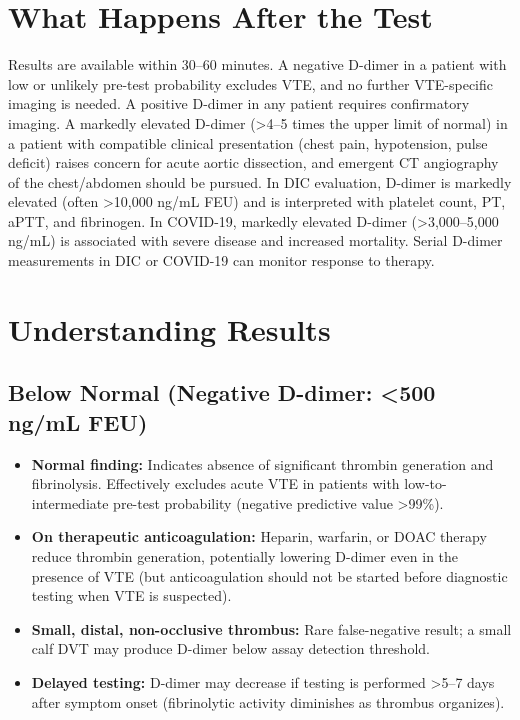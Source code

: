 \section*{What Happens After the Test}
Results are available within 30--60 minutes. A negative D-dimer in a patient with low or unlikely pre-test probability excludes VTE, and no further VTE-specific imaging is needed. A positive D-dimer in any patient requires confirmatory imaging. A markedly elevated D-dimer (>4--5 times the upper limit of normal) in a patient with compatible clinical presentation (chest pain, hypotension, pulse deficit) raises concern for acute aortic dissection, and emergent CT angiography of the chest/abdomen should be pursued. In DIC evaluation, D-dimer is markedly elevated (often >10,000 ng/mL FEU) and is interpreted with platelet count, PT, aPTT, and fibrinogen. In COVID-19, markedly elevated D-dimer (>3,000--5,000 ng/mL) is associated with severe disease and increased mortality. Serial D-dimer measurements in DIC or COVID-19 can monitor response to therapy.

\section*{Understanding Results}

\subsection*{Below Normal (Negative D-dimer: <500 ng/mL FEU)}
\begin{itemize}
  \item \textbf{Normal finding:} Indicates absence of significant thrombin generation and fibrinolysis. Effectively excludes acute VTE in patients with low-to-intermediate pre-test probability (negative predictive value >99\%).
  \item \textbf{On therapeutic anticoagulation:} Heparin, warfarin, or DOAC therapy reduce thrombin generation, potentially lowering D-dimer even in the presence of VTE (but anticoagulation should not be started before diagnostic testing when VTE is suspected).
  \item \textbf{Small, distal, non-occlusive thrombus:} Rare false-negative result; a small calf DVT may produce D-dimer below assay detection threshold.
  \item \textbf{Delayed testing:} D-dimer may decrease if testing is performed >5--7 days after symptom onset (fibrinolytic activity diminishes as thrombus organizes).
\end{itemize}

